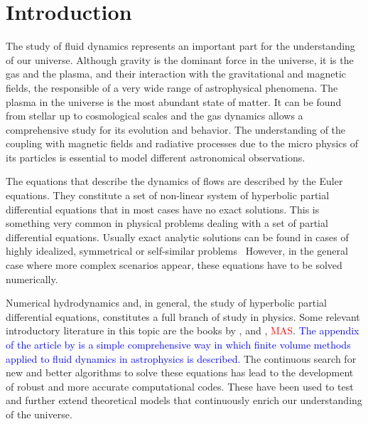 
\section{Introduction}
\label{sec:intro}


The study of fluid dynamics represents an important
part for the understanding of our universe. Although gravity is the
dominant force in the universe, it is the gas and the plasma, and their
interaction with the gravitational and magnetic fields, the responsible
of a very wide range of astrophysical phenomena. The plasma in the
universe  is the most abundant state of matter.   It can 
be found from stellar up to cosmological scales and the gas dynamics
allows a comprehensive study for  its evolution and behavior.  The
understanding of the coupling with magnetic
fields and radiative processes due to the micro physics of its particles is
essential to model different astronomical observations.

The equations that describe the dynamics of flows are described by the
Euler equations. They constitute a set of non-linear system of hyperbolic
partial differential equations that in most cases have no exact solutions.
This is something very common in physical problems dealing with a set
of partial differential equations.  Usually exact analytic solutions
can be found in cases of highly idealized, symmetrical or self-similar
problems~\citep[see for example][]{landau1987,sedov1959,toro2009,edgar2004} %
However, in the general
case where more complex scenarios appear, these equations have to be
solved numerically.

Numerical hydrodynamics and, in general, the study of hyperbolic
partial differential equations, constitutes a full branch of study
in physics. Some relevant introductory literature in this topic are the
books by \citet{toro2009}, \citet{leveque2002} and \citet{laney1998},
\textcolor{red}{MAS}.  \textcolor{blue}{The appendix of the article by \citet{aguayo2018} is
a simple comprehensive way in which finite volume methods applied to fluid
dynamics in astrophysics is described.} The continuous search for new and better algorithms to
solve these equations has lead to the development of robust and more accurate
computational codes. These have been used to test and further extend
theoretical models that continuously enrich our understanding of the universe.

